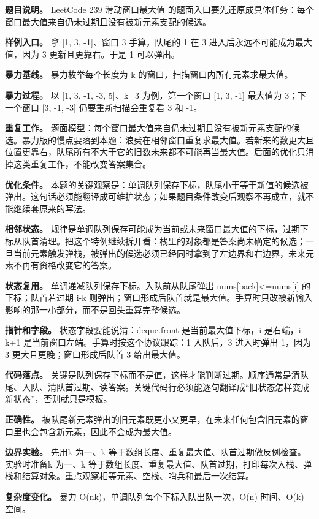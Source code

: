 \textbf{题目说明。} LeetCode 239 滑动窗口最大值 的题面入口要先还原成具体任务：每个窗口最大值来自仍未过期且没有被新元素支配的候选。

\textbf{样例入口。} 拿 [1, 3, -1]、窗口 3 手算，队尾的 1 在 3 进入后永远不可能成为最大值，因为 3 更新且更靠右。于是 1 可以弹出。

\textbf{暴力基线。} 暴力枚举每个长度为 k 的窗口，扫描窗口内所有元素求最大值。

\textbf{暴力过程。} 以 [1, 3, -1, -3, 5]、k=3 为例，第一个窗口 [1, 3, -1] 最大值为 3；下一个窗口 [3, -1, -3] 仍要重新扫描会重复看 3 和 -1。

\textbf{重复工作。} 题面模型：每个窗口最大值来自仍未过期且没有被新元素支配的候选。暴力版的慢点要落到本题：浪费在相邻窗口重复求最大值。若新来的数更大且位置更靠右，队尾所有不大于它的旧数未来都不可能再当最大值。后面的优化只消掉这类重复工作，不能改变答案集合。

\textbf{优化条件。} 本题的关键观察是：单调队列保存下标，队尾小于等于新值的候选被弹出。这句话必须能翻译成可维护状态；如果题目条件改变后观察不再成立，就不能继续套原来的写法。

\textbf{相邻状态。} 规律是单调队列保存可能成为当前或未来窗口最大值的下标，过期下标从队首清理。把这个特例继续拆开看：栈里的对象都是答案尚未确定的候选；一旦当前元素触发弹栈，被弹出的候选必须已经同时拿到了左边界和右边界，未来元素不再有资格改变它的答案。

\textbf{状态复用。} 单调递减队列保存下标。入队前从队尾弹出 nums[back]<=nums[i] 的下标；队首若过期 i-k 则弹出；窗口形成后队首就是最大值。手算时只改被新输入影响的那一小部分，而不是回头重算完整候选。

\textbf{指针和字段。} 状态字段要能说清：deque.front 是当前最大值下标，i 是右端，i-k+1 是当前窗口左端。手算时按这个协议跟踪：1 入队后，3 进入时弹出 1，因为 3 更大且更晚；窗口形成后队首 3 给出最大值。

\textbf{代码落点。} 关键是队列保存下标而不是值，这样才能判断过期。顺序通常是清队尾、入队、清队首过期、读答案。关键代码行必须能逐句翻译成“旧状态怎样变成新状态”，否则就只是模板。

\textbf{正确性。} 被队尾新元素弹出的旧元素既更小又更早，在未来任何包含旧元素的窗口里也会包含新元素，因此不会成为最大值。

\textbf{边界实验。} 先用k 为一、k 等于数组长度、重复最大值、队首过期做反例检查。实验时准备k 为一、k 等于数组长度、重复最大值、队首过期，打印每次入栈、弹栈和结算对象。重点观察相等元素、空栈、哨兵和最后一次结算。

\textbf{复杂度变化。} 暴力 O(nk)，单调队列每个下标入队出队一次，O(n) 时间、O(k) 空间。

